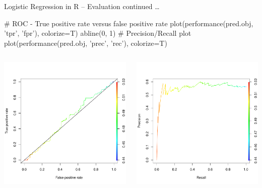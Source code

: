 \documentclass[ignorenonframetext,xcolor=x11names]{beamer}
\begin{document}
\begin{frame}[fragile]{Logistic Regression in R -- Evaluation}
\small
continued \ldots
\begin{Rcode}
# ROC - True positive rate versus false positive rate
plot(performance(pred.obj, 'tpr', 'fpr'), colorize=T)
abline(0, 1)
# Precision/Recall plot
plot(performance(pred.obj, 'prec', 'rec'), colorize=T)
\end{Rcode}

\begin{columns}
\begin{column}{.4\textwidth}
\includegraphics[width=\textwidth]{roc.pdf}
\end{column}
\begin{column}{.4\textwidth}
\includegraphics[width=\textwidth]{precrec.pdf}

\end{column}
\end{columns}
\end{frame}
\end{document}
